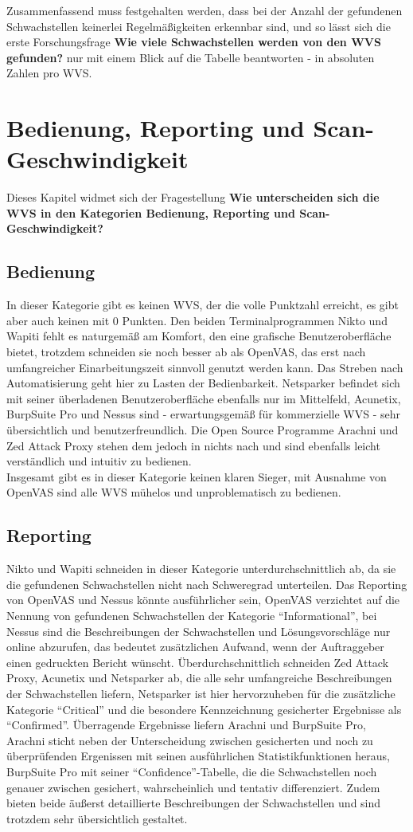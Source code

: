 \documentclass[12pt,oneside,a4paper,parskip]{scrbook}
\begin{document}
  Zusammenfassend muss festgehalten werden, dass bei der Anzahl der gefundenen Schwachstellen keinerlei Regelmäßigkeiten erkennbar sind, und so lässt sich die erste Forschungsfrage \textbf{Wie viele Schwachstellen werden von den WVS gefunden?} nur mit einem Blick auf die Tabelle beantworten - in absoluten Zahlen pro WVS.

  \section{Bedienung, Reporting und Scan-Geschwindigkeit}
  Dieses Kapitel widmet sich der Fragestellung \textbf{Wie unterscheiden sich die WVS in den Kategorien Bedienung, Reporting und Scan-Geschwindigkeit?}
  \subsection{Bedienung}
  In dieser Kategorie gibt es keinen WVS, der die volle Punktzahl erreicht, es gibt aber auch keinen mit 0 Punkten. Den beiden Terminalprogrammen Nikto und Wapiti fehlt es naturgemäß am Komfort, den eine grafische Benutzeroberfläche bietet, trotzdem schneiden sie noch besser ab als OpenVAS, das erst nach umfangreicher Einarbeitungszeit sinnvoll genutzt werden kann. Das Streben nach Automatisierung geht hier zu Lasten der Bedienbarkeit. Netsparker befindet sich mit seiner überladenen Benutzeroberfläche ebenfalls nur im Mittelfeld, Acunetix, BurpSuite Pro und Nessus sind - erwartungsgemäß für kommerzielle WVS - sehr übersichtlich und benutzerfreundlich.
  Die Open Source Programme Arachni und Zed Attack Proxy stehen dem jedoch in nichts nach und sind ebenfalls leicht verständlich und intuitiv zu bedienen. \\
  Insgesamt gibt es in dieser Kategorie keinen klaren Sieger, mit Ausnahme von OpenVAS sind alle WVS mühelos und unproblematisch zu bedienen.
  \subsection{Reporting}
  Nikto und Wapiti schneiden in dieser Kategorie unterdurchschnittlich ab, da sie die gefundenen Schwachstellen nicht nach Schweregrad unterteilen. Das Reporting von OpenVAS und Nessus könnte ausführlicher sein, OpenVAS verzichtet auf die Nennung von gefundenen Schwachstellen der Kategorie ``Informational'', bei Nessus sind die Beschreibungen der Schwachstellen und Lösungsvorschläge nur online abzurufen, das bedeutet zusätzlichen Aufwand, wenn der Auftraggeber einen gedruckten Bericht wünscht.
  Überdurchschnittlich schneiden Zed Attack Proxy, Acunetix und Netsparker ab, die alle sehr umfangreiche Beschreibungen der Schwachstellen liefern, Netsparker ist hier hervorzuheben für die zusätzliche Kategorie ``Critical'' und die besondere Kennzeichnung gesicherter Ergebnisse als ``Confirmed''.
  Überragende Ergebnisse liefern Arachni und BurpSuite Pro, Arachni sticht neben der Unterscheidung zwischen gesicherten und noch zu überprüfenden Ergenissen mit seinen ausführlichen Statistikfunktionen heraus, BurpSuite Pro mit seiner ``Confidence''-Tabelle, die die Schwachstellen noch genauer zwischen gesichert, wahrscheinlich und tentativ differenziert. Zudem bieten beide äußerst detaillierte Beschreibungen der Schwachstellen und sind trotzdem sehr übersichtlich gestaltet.
\end{document}
